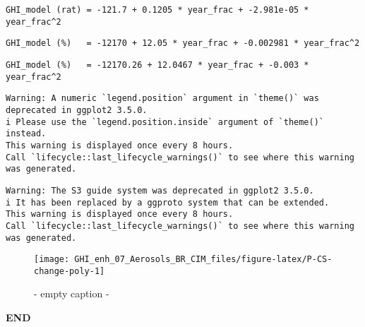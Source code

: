 \documentclass[
  10pt,
  a4paper,oneside]{article}
\begin{document}
\begin{verbatim}
GHI_model (rat) = -121.7 + 0.1205 * year_frac + -2.981e-05 * year_frac^2 
\end{verbatim}

\begin{verbatim}
GHI_model (%)   = -12170 + 12.05 * year_frac + -0.002981 * year_frac^2 
\end{verbatim}

\begin{verbatim}
GHI_model (%)   = -12170.26 + 12.0467 * year_frac + -0.003 * year_frac^2 
\end{verbatim}

\begin{verbatim}
Warning: A numeric `legend.position` argument in `theme()` was deprecated in ggplot2 3.5.0.
i Please use the `legend.position.inside` argument of `theme()` instead.
This warning is displayed once every 8 hours.
Call `lifecycle::last_lifecycle_warnings()` to see where this warning was generated.
\end{verbatim}

\begin{verbatim}
Warning: The S3 guide system was deprecated in ggplot2 3.5.0.
i It has been replaced by a ggproto system that can be extended.
This warning is displayed once every 8 hours.
Call `lifecycle::last_lifecycle_warnings()` to see where this warning was generated.
\end{verbatim}

\begin{figure}[H]

{\centering \texttt{[image: GHI\_enh\_07\_Aerosols\_BR\_CIM\_files/figure-latex/P-CS-change-poly-1]} 

}

\caption{ - empty caption - }\label{fig:P-CS-change-poly}
\end{figure}

\textbf{END}
\end{document}
